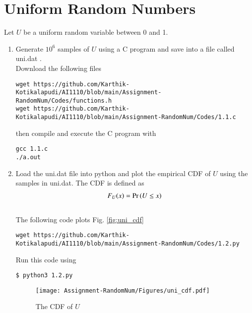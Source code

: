 \documentclass[journal,12pt,twocolumn]{IEEEtran}
\renewcommand\thesection{\arabic{section}}
\begin{document}
\section{Uniform Random Numbers}
Let $U$ be a uniform random variable between 0 and 1.
\begin{enumerate}[label=\thesection.\arabic*
,ref=\thesection.\theenumi]
\item Generate $10^6$ samples of $U$ using a C program and save into a file called uni.dat .
\\
\solution Download the following files 
\begin{lstlisting}
wget https://github.com/Karthik-Kotikalapudi/AI1110/blob/main/Assignment-RandomNum/Codes/functions.h
wget https://github.com/Karthik-Kotikalapudi/AI1110/blob/main/Assignment-RandomNum/Codes/1.1.c
\end{lstlisting}
then compile and execute the  C program with
\begin{lstlisting}
gcc 1.1.c
./a.out
\end{lstlisting}
%
\item
Load the uni.dat file into python and plot the empirical CDF of $U$ using the samples in uni.dat. The CDF is defined as
\begin{align}
F_{U}(x) = \Pr\left(U \le x\right)
\end{align}
\\
\solution  The following code plots Fig. \eqref{fig:uni_cdf}
\begin{lstlisting}
wget https://github.com/Karthik-Kotikalapudi/AI1110/blob/main/Assignment-RandomNum/Codes/1.2.py
\end{lstlisting}
Run this code using
\begin{lstlisting}
$ python3 1.2.py
\end{lstlisting}
\begin{figure}
\centering
\texttt{[image: Assignment-RandomNum/Figures/uni\_cdf.pdf]}
\caption{The CDF of $U$}
\label{fig:uni_cdf}
\end{figure}


\end{enumerate}
\end{document}
